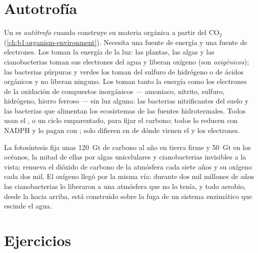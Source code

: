 \section{Autotrofía}

\begin{definition}[Autotrofía]\label{def:b1:photosynthesis:autotrophy}
Un  es \emph{autótrofo} cuando construye su
materia orgánica a partir del $\mathrm{CO_2}$
(\cref{ch:b1:organism-environment}). Necesita una fuente de energía y una
fuente de electrones. Los \emph{} toman la energía de la luz:
las plantas, las algas y las cianobacterias toman sus electrones del agua y
liberan oxígeno (son \emph{oxigénicos}); las bacterias púrpuras y verdes los
toman del sulfuro de hidrógeno o de ácidos orgánicos y no liberan ninguno.
Los \emph{} toman tanto la energía como los electrones de la
oxidación de compuestos inorgánicos --- amoniaco, nitrito, sulfuro,
hidrógeno, hierro ferroso --- sin luz alguna: las bacterias nitrificantes
del suelo y las bacterias que alimentan los ecosistemas de las fuentes
hidrotermales. Todos usan el , o un ciclo emparentado, para
fijar el carbono; todos lo reducen con NADPH y lo pagan con ; solo
difieren en de dónde vienen el  y los electrones.
\end{definition}

\begin{example}\label{ex:b1:photosynthesis:global}
La fotosíntesis fija unas \qty{120}{Gt} de carbono al año en tierra firme y
\qty{50}{Gt} en los océanos, la mitad de ellas por algas unicelulares y
cianobacterias invisibles a la vista; renueva el dióxido de carbono de la
atmósfera cada siete años y su oxígeno cada dos mil. El oxígeno llegó por la
misma vía: durante dos mil millones de años las cianobacterias lo liberaron
a una atmósfera que no lo tenía, y todo  aerobio, desde la
 hacia arriba, está construido sobre la fuga de un sistema
enzimático que escinde el agua.
\end{example}

\section{Ejercicios}

